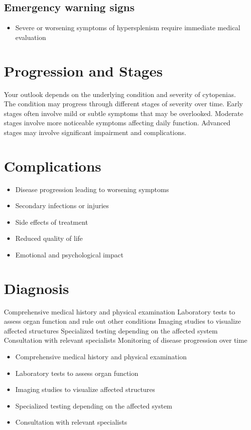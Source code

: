 \subsection{Emergency warning signs}
\begin{itemize}[noitemsep]
  \item Severe or worsening symptoms of hypersplenism require immediate medical evaluation
\end{itemize}
\section{Progression and Stages}
Your outlook depends on the underlying condition and severity of cytopenias. The condition may progress through different stages of severity over time. Early stages often involve mild or subtle symptoms that may be overlooked. Moderate stages involve more noticeable symptoms affecting daily function. Advanced stages may involve significant impairment and complications.
\section{Complications}
\begin{itemize}[noitemsep]
  \item Disease progression leading to worsening symptoms
  \item Secondary infections or injuries
  \item Side effects of treatment
  \item Reduced quality of life
  \item Emotional and psychological impact
\end{itemize}
\section{Diagnosis}
Comprehensive medical history and physical examination Laboratory tests to assess organ function and rule out other conditions Imaging studies to visualize affected structures Specialized testing depending on the affected system Consultation with relevant specialists Monitoring of disease progression over time

\begin{itemize}[noitemsep]
  \item Comprehensive medical history and physical examination
  \item Laboratory tests to assess organ function
  \item Imaging studies to visualize affected structures
  \item Specialized testing depending on the affected system
  \item Consultation with relevant specialists
\end{itemize}
